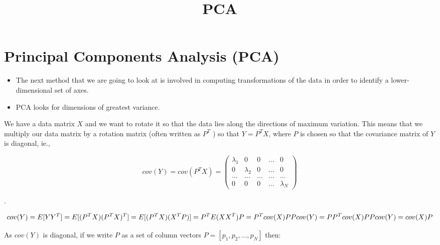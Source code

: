 \documentclass[11pt]{article}
\title{PCA}
\providecommand{\tightlist}{%
      \setlength{\itemsep}{0pt}\setlength{\parskip}{0pt}}
\begin{document}
    
    
    \maketitle
    
    

    
    \section{Principal Components Analysis
(PCA)}\label{principal-components-analysis-pca}

\begin{itemize}
\tightlist
\item
  The next method that we are going to look at is involved in computing
  transformations of the data in order to identify a lower-dimensional
  set of axes.
\item
  PCA looks for dimensions of greatest variance.
\end{itemize}

    We have a data matrix \(X\) and we want to rotate it so that the data
lies along the directions of maximum variation. This means that we
multiply our data matrix by a rotation matrix (often written as \(P^T\)
) so that \(Y = P^T X\), where \(P\) is chosen so that the covariance
matrix of \(Y\) is diagonal, ie.,

\begin{equation}
cov(Y)= cov(P^{T}X) =
\begin{pmatrix}
\lambda_1 & 0 & 0 & ... & 0\\
   0 & \lambda_2 & 0 & ... & 0\\
   ... & ... & ... & ... & ...\\
   0 & 0 & 0 & ... & \lambda_N
\end{pmatrix} 
\end{equation}

.

\begin{equation}
cov(Y) = E[YY^T] \\
= E[(P^{T}X)(P^{T}X)^T] \\
= E[(P^{T}X)(X^{T}P)] \\
= P^{T}E(XX^T)P \\
= P^{T}cov(X)P \\
Pcov(Y) = PP^{T}cov(X)P \\
Pcov(Y) = cov(X)P \\
\end{equation}

As \(cov(Y)\) is diagonal, if we write \(P\) as a set of column vectors
\(P = [p_1 , p_2 , . . . , p_N]\) then:
\end{document}
